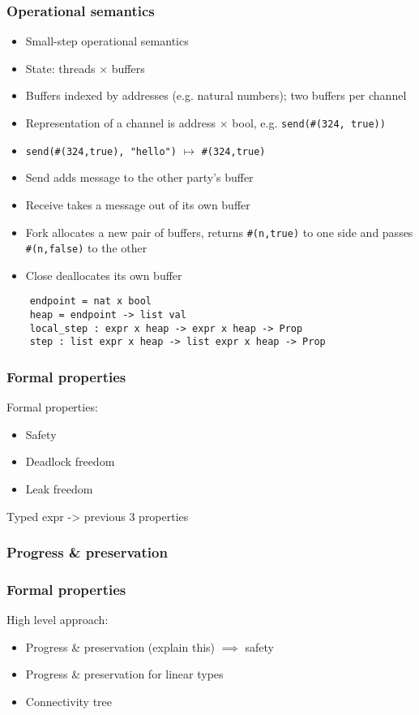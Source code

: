 \documentclass[aspectratio=169]{beamer}
\begin{document}
\begin{frame}[fragile]
  \frametitle{Operational semantics}
  \begin{itemize}
    \item Small-step operational semantics
    \item State: threads $\times$ buffers
    \item Buffers indexed by addresses (e.g. natural numbers); two buffers per channel
    \item Representation of a channel is address $\times$ bool, e.g. \lstinline|send(#(324, true))|
    \item \lstinline|send(#(324,true), "hello")| $\mapsto$ \lstinline|#(324,true)|
    \item Send adds message to the other party's buffer
    \item Receive takes a message out of its own buffer
    \item Fork allocates a new pair of buffers, returns \lstinline|#(n,true)| to one
          side and passes \lstinline|#(n,false)| to the other
    \item Close deallocates its own buffer
  \end{itemize}
  \begin{lstlisting}
    endpoint = nat x bool
    heap = endpoint -> list val
    local_step : expr x heap -> expr x heap -> Prop
    step : list expr x heap -> list expr x heap -> Prop
  \end{lstlisting}
\end{frame}

\begin{frame}[fragile]
  \frametitle{Formal properties}
  Formal properties:
  \begin{itemize}
    \item Safety
    \item Deadlock freedom
    \item Leak freedom
  \end{itemize}

  \begin{theorem}
    Typed expr -> previous 3 properties
  \end{theorem}
\end{frame}

\begin{frame}[fragile]
  \frametitle{Progress \& preservation}

\end{frame}

\begin{frame}[fragile]
  \frametitle{Formal properties}
  High level approach:
  \begin{itemize}
    \item Progress \& preservation (explain this) $\implies$ safety
    \item Progress \& preservation for linear types
    \item Connectivity tree
  \end{itemize}
\end{frame}
\end{document}
